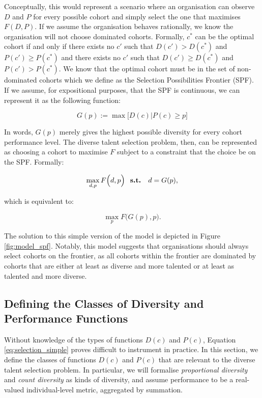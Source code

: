 Conceptually, this would represent a scenario where an organisation can observe $D$ and $P$ for every possible cohort and simply select the one that maximises $F(D,P)$. If we assume the organisation behaves rationally, we know the organisation will not choose dominated cohorts. Formally, $c^*$ can be the optimal cohort if and only if there exists no $c'$ such that $D(c')>D(c^*)$ and $P(c')\geq P(c^*)$ and there exists no $c'$ such that $D(c')\geq D(c^*)$ and $P(c')> P(c^*)$. We know that the optimal cohort must be in the set of non-dominated cohorts which we define as the Selection Possibilities Frontier (SPF). If we assume, for expositional purposes, that the SPF is continuous, we can represent it as the following function:

\begin{equation}
G(p) := \max\Big[D(c)|P(c) \geq p\Big]
\end{equation}

\noindent In words, $G(p)$ merely gives the highest possible diversity for every cohort performance level. The diverse talent selection problem, then, can be represented as choosing a cohort to maximise $F$ subject to a constraint that the choice be on the SPF. Formally: 

\begin{equation}
\max_{d,p} F\Big(d,p\Big) \text{ \bf{ s.t. } } d = G(p), \nonumber 
\end{equation}

\noindent which is equivalent to:

\begin{equation}
\max_{p} F\Big(G(p) ,p\Big). \label{eq:selection_simple}
\end{equation}

The solution to this simple version of the model is depicted in Figure \ref{fig:model_spf}. Notably, this model suggests that organisations should always select cohorts on the frontier, as all cohorts within the frontier are dominated by cohorts that are either at least as diverse and more talented or at least as talented and more diverse.

\subsection{Defining the Classes of Diversity and Performance Functions}\label{subsubsec:div_talent_def}
Without knowledge of the types of functions $D(c)$ and $P(c)$, Equation \ref{eq:selection_simple} proves difficult to instrument in practice. In this section, we define the classes of functions $D(c)$ and $P(c)$ that are relevant to the diverse talent selection problem. In particular, we will formalise \emph{proportional diversity} and \emph{count diversity} as kinds of diversity, and assume performance to be a real-valued individual-level metric, aggregated by summation.


